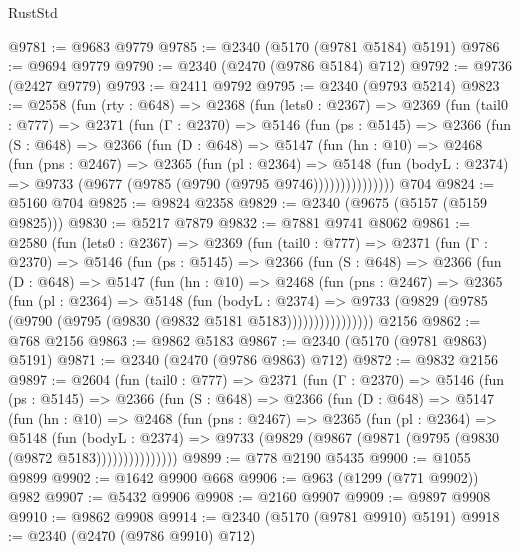 \begin{lexlean}{RustStd}
\begin{coremodule}
@9781 := @9683 @9779
@9785 := @2340 (@5170 (@9781 @5184) @5191)
@9786 := @9694 @9779
@9790 := @2340 (@2470 (@9786 @5184) @712)
@9792 := @9736 (@2427 @9779)
@9793 := @2411 @9792
@9795 := @2340 (@9793 @5214)
@9823 := @2558
    (fun (rty : @648) =>
    @2368
      (fun (lets0 : @2367) =>
      @2369
        (fun (tail0 : @777) =>
        @2371
          (fun (Γ : @2370) =>
          @5146
            (fun (ps : @5145) =>
            @2366
              (fun (S : @648) =>
              @2366
                (fun (D : @648) =>
                @5147
                  (fun (hn : @10) =>
                  @2468
                    (fun (pns : @2467) =>
                    @2365
                      (fun (pl : @2364) =>
                      @5148
                        (fun (bodyL : @2374) =>
                        @9733 (@9677 (@9785 (@9790 (@9795 @9746)))))))))))))))
    @704
@9824 := @5160 @704
@9825 := @9824 @2358
@9829 := @2340 (@9675 (@5157 (@5159 @9825)))
@9830 := @5217 @7879
@9832 := @7881 @9741 @8062
@9861 := @2580
    (fun (lets0 : @2367) =>
    @2369
      (fun (tail0 : @777) =>
      @2371
        (fun (Γ : @2370) =>
        @5146
          (fun (ps : @5145) =>
          @2366
            (fun (S : @648) =>
            @2366
              (fun (D : @648) =>
              @5147
                (fun (hn : @10) =>
                @2468
                  (fun (pns : @2467) =>
                  @2365
                    (fun (pl : @2364) =>
                    @5148
                      (fun (bodyL : @2374) =>
                      @9733 (@9829 (@9785 (@9790 (@9795 (@9830 (@9832 @5181 @5183))))))))))))))))
    @2156
@9862 := @768 @2156
@9863 := @9862 @5183
@9867 := @2340 (@5170 (@9781 @9863) @5191)
@9871 := @2340 (@2470 (@9786 @9863) @712)
@9872 := @9832 @2156
@9897 := @2604
    (fun (tail0 : @777) =>
    @2371
      (fun (Γ : @2370) =>
      @5146
        (fun (ps : @5145) =>
        @2366
          (fun (S : @648) =>
          @2366
            (fun (D : @648) =>
            @5147
              (fun (hn : @10) =>
              @2468
                (fun (pns : @2467) =>
                @2365
                  (fun (pl : @2364) =>
                  @5148
                    (fun (bodyL : @2374) =>
                    @9733 (@9829 (@9867 (@9871 (@9795 (@9830 (@9872 @5183)))))))))))))))
@9899 := @778 @2190 @5435
@9900 := @1055 @9899
@9902 := @1642 @9900 @668
@9906 := @963 (@1299 (@771 @9902)) @982
@9907 := @5432 @9906
@9908 := @2160 @9907
@9909 := @9897 @9908
@9910 := @9862 @9908
@9914 := @2340 (@5170 (@9781 @9910) @5191)
@9918 := @2340 (@2470 (@9786 @9910) @712)

\end{coremodule}
\end{lexlean}
